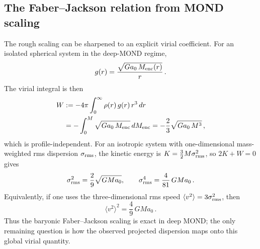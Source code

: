\documentclass[11pt]{article}
\begin{document}
\subsection{The Faber--Jackson relation from MOND scaling}

The rough scaling can be sharpened to an explicit virial coefficient.
For an isolated spherical system in the deep-MOND regime,
\begin{equation}
  g(r)=\frac{\sqrt{G a_0\,M_{\rm enc}(r)}}{r}\,.
\label{eq:deepmond_ell_force}
\end{equation}
The virial integral is then
\begin{align}
  W
  &:=
  -4\pi\int_0^\infty \rho(r)\,g(r)\,r^3\,dr \notag\\
  &=
  -\int_0^M \sqrt{G a_0\,M_{\rm enc}}\,dM_{\rm enc}
  =
  -\frac{2}{3}\sqrt{G a_0\,M^3}\,,
\label{eq:elliptical_virial_exact}
\end{align}
which is profile-independent.  For an isotropic system with one-dimensional
mass-weighted rms dispersion $\sigma_{\rm rms}$, the kinetic energy is
$K=\tfrac32 M\sigma_{\rm rms}^2$, so $2K+W=0$ gives
\begin{equation}
  \sigma_{\rm rms}^2
  =
  \frac{2}{9}\sqrt{GMa_0},
  \qquad
  \sigma_{\rm rms}^4
  =
  \frac{4}{81}\,GMa_0\,.
\label{eq:faber_jackson_global}
\end{equation}
Equivalently, if one uses the three-dimensional rms speed
$\langle v^2\rangle=3\sigma_{\rm rms}^2$, then
\begin{equation}
  \langle v^2\rangle^2 = \frac{4}{9}\,GMa_0\,.
\label{eq:faber_jackson_3d}
\end{equation}
Thus the baryonic Faber--Jackson scaling is exact in deep MOND; the only
remaining question is how the observed projected dispersion maps onto this
global virial quantity.
\end{document}
